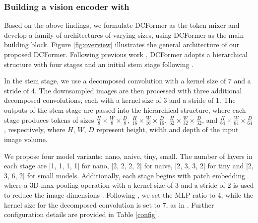 \subsubsection*{Building a vision encoder with \dc}
Based on the above findings, we formulate DCFormer as the token mixer and develop a family of architectures of varying sizes, using DCFormer as the main building block. Figure \ref{fig:overview} illustrates the general architecture of our proposed DCFormer. Following previous work \cite{he2016deep, liu2021swin, liu2022convnet, yu2022metaformer, wang2023internimage, yu2024inceptionnext}, DCFormer adopts a hierarchical structure with four stages and an initial stem stage following \cite{wang2023internimage, dai2021coatnet}. 

In the stem stage, we use a decomposed convolution with a kernel size of 7 and a stride of 4. The downsampled images are then processed with three additional decomposed convolutions, each with a kernel size of 3 and a stride of 1. The outputs of the stem stage are passed into the hierarchical structure, where each stage produces tokens of sizes \(\frac{H}{8} \times \frac{W}{8} \times \frac{D}{8}\), \(\frac{H}{16} \times \frac{W}{16} \times \frac{D}{16}\), \(\frac{H}{32} \times \frac{W}{32} \times \frac{D}{32}\), and \(\frac{H}{64} \times \frac{W}{64} \times \frac{D}{64}\), respectively, where $H$, $W$, $D$ represent height, width and depth of the input image volume. 

We propose four model variants: nano, naive, tiny, small. The number of layers in each stage are [1, 1, 1, 1] for nano, [2, 2, 2, 2] for naive, [2, 3, 3, 2] for tiny and [2, 3, 6, 2] for small models. Additionally, each stage begins with patch embedding where a 3D max pooling operation with a kernel size of 3 and a stride of 2 is used to reduce the image dimensions \cite{dai2021coatnet}. Following \cite{dosovitskiy2020image, liu2022convnet, yu2024inceptionnext}, we set the MLP ratio to 4, while the kernel size for the decomposed convolution is set to 7, as in \cite{liu2021swin, liu2022convnet}. Further configuration details are provided in Table \ref{config}. 


